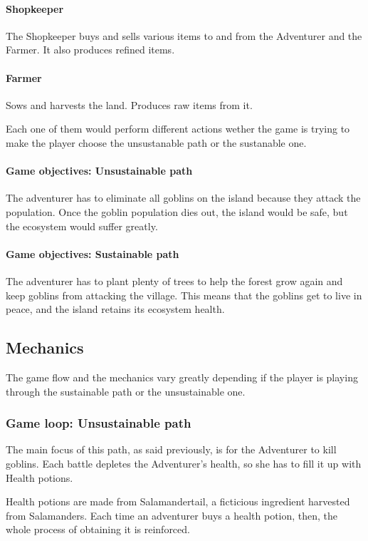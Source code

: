 \paragraph{Shopkeeper}
The Shopkeeper buys and sells various items to and from the Adventurer and the Farmer. It also produces refined items.

\paragraph{Farmer}
Sows and harvests the land. Produces raw items from it.

Each one of them would perform different actions wether the game is trying
to make the player choose the unsustanable path or the sustanable one.

\paragraph{Game objectives: Unsustainable path}
The adventurer has to eliminate all goblins on the island because they attack the population. Once the goblin population dies out, the island would be safe, but the
ecosystem would suffer greatly.

\paragraph{Game objectives: Sustainable path}
The adventurer has to plant plenty of trees to help the forest grow again and keep goblins from attacking the village.
This means that the goblins get to live in peace, and the island retains
its ecosystem health.

\subsection{Mechanics}

The game flow and the mechanics vary greatly depending if the player is
playing through the sustainable path or the unsustainable one.

\subsubsection{Game loop: Unsustainable path}

The main focus of this path, as said previously, is for the Adventurer
to kill goblins. Each battle depletes the Adventurer's health,
so she has to fill it up with Health potions.

Health potions are made from Salamandertail, a ficticious ingredient
harvested from Salamanders. Each time an adventurer buys a health
potion, then, the whole process of obtaining it is reinforced.

